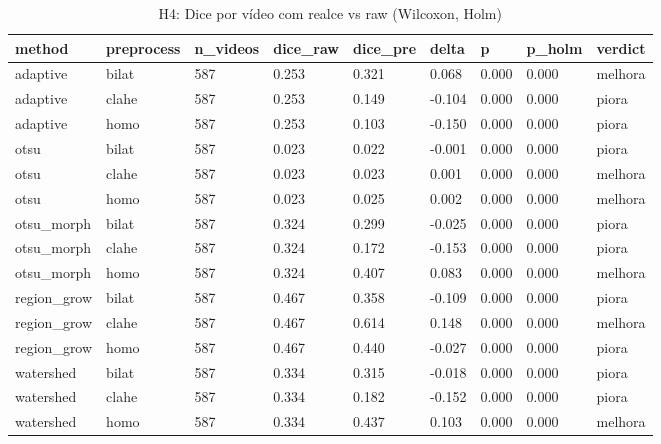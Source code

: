\begin{table}[ht]
\centering
\caption{H4: Dice por vídeo com realce vs raw (Wilcoxon, Holm)}
\begin{tabular}{lllllllll}
\toprule
method & preprocess & n\_videos & dice\_raw & dice\_pre & delta & p & p\_holm & verdict \\
\midrule
adaptive & bilat & 587 & 0.253 & 0.321 & 0.068 & 0.000 & 0.000 & melhora \\
adaptive & clahe & 587 & 0.253 & 0.149 & -0.104 & 0.000 & 0.000 & piora \\
adaptive & homo & 587 & 0.253 & 0.103 & -0.150 & 0.000 & 0.000 & piora \\
otsu & bilat & 587 & 0.023 & 0.022 & -0.001 & 0.000 & 0.000 & piora \\
otsu & clahe & 587 & 0.023 & 0.023 & 0.001 & 0.000 & 0.000 & melhora \\
otsu & homo & 587 & 0.023 & 0.025 & 0.002 & 0.000 & 0.000 & melhora \\
otsu\_morph & bilat & 587 & 0.324 & 0.299 & -0.025 & 0.000 & 0.000 & piora \\
otsu\_morph & clahe & 587 & 0.324 & 0.172 & -0.153 & 0.000 & 0.000 & piora \\
otsu\_morph & homo & 587 & 0.324 & 0.407 & 0.083 & 0.000 & 0.000 & melhora \\
region\_grow & bilat & 587 & 0.467 & 0.358 & -0.109 & 0.000 & 0.000 & piora \\
region\_grow & clahe & 587 & 0.467 & 0.614 & 0.148 & 0.000 & 0.000 & melhora \\
region\_grow & homo & 587 & 0.467 & 0.440 & -0.027 & 0.000 & 0.000 & piora \\
watershed & bilat & 587 & 0.334 & 0.315 & -0.018 & 0.000 & 0.000 & piora \\
watershed & clahe & 587 & 0.334 & 0.182 & -0.152 & 0.000 & 0.000 & piora \\
watershed & homo & 587 & 0.334 & 0.437 & 0.103 & 0.000 & 0.000 & melhora \\
\bottomrule
\end{tabular}
\end{table}